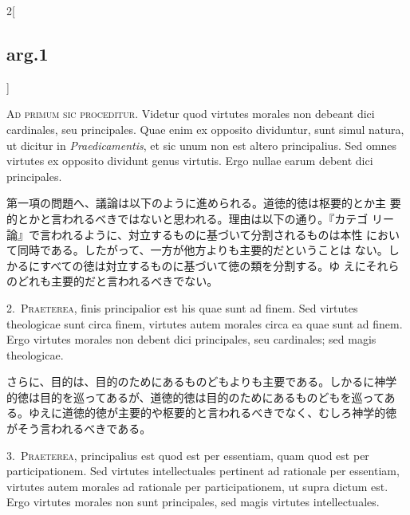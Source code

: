 \documentclass[paper=a4paper,fontsize=10pt,jafontsize=9pt,titlepage]{jlreq}
\begin{document}
\begin{paracol}{2}[\subsection{arg.1}]

{\scshape Ad primum sic proceditur}. Videtur quod virtutes morales non
debeant dici cardinales, seu principales. Quae enim ex opposito
dividuntur, sunt simul natura, ut dicitur in {\itshape
Praedicamentis}, et sic unum non est altero principalius. Sed omnes
virtutes ex opposito dividunt genus virtutis. Ergo nullae earum debent
dici principales.

\switchcolumn

第一項の問題へ、議論は以下のように進められる。道徳的徳は枢要的とか主
 要的とかと言われるべきではないと思われる。理由は以下の通り。『カテゴ
 リー論』で言われるように、対立するものに基づいて分割されるものは本性
 において同時である。したがって、一方が他方よりも主要的だということは
 ない。しかるにすべての徳は対立するものに基づいて徳の類を分割する。ゆ
 えにそれらのどれも主要的だと言われるべきでない。


2.~{\scshape Praeterea}, finis principalior est his quae sunt ad
finem. Sed virtutes theologicae sunt circa finem, virtutes autem
morales circa ea quae sunt ad finem. Ergo virtutes morales non debent
dici principales, seu cardinales; sed magis theologicae.

\switchcolumn

さらに、目的は、目的のためにあるものどもよりも主要である。しかるに神学
的徳は目的を巡ってあるが、道徳的徳は目的のためにあるものどもを巡ってあ
る。ゆえに道徳的徳が主要的や枢要的と言われるべきでなく、むしろ神学的徳
がそう言われるべきである。


3.~{\scshape Praeterea}, principalius est quod est per essentiam, quam
quod est per participationem. Sed virtutes intellectuales pertinent ad
rationale per essentiam, virtutes autem morales ad rationale per
participationem, ut supra dictum est. Ergo virtutes morales non sunt
principales, sed magis virtutes intellectuales.


\end{paracol}
\end{document}
